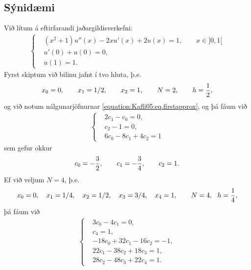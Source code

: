 \documentclass[a4paper,10pt,icelandic]{sphinxmanual}
\begin{document}
\subsection{Sýnidæmi}
\label{\detokenize{Kafli05:synidaemi}}\label{\detokenize{Kafli05:example-5-1-1}}
Við lítum á eftirfarandi jaðargildisverkefni:
\begin{equation*}
\begin{split}\begin{cases}
&\left(x^2+1\right) u''(x)-2 x u'(x)+2 u(x)=1,\qquad  x \in ]0,1[\\
&u'(0)+u(0)=0,\\
&u(1)=1.
\end{cases}\end{split}
\end{equation*}
Fyrst skiptum við bilinu jafnt í tvo hluta,  þ.e.
\begin{equation*}
\begin{split}x_0=0, \qquad x_1= 1/2 , \qquad x_2 = 1, \qquad N=2, \qquad h={1 \over 2},\end{split}
\end{equation*}
og við notum nálgunarjöfnurnar \eqref{equation:Kafli05:eq.firstapprox}, og þá fáum við
\begin{equation*}
\begin{split}\begin{cases}
& 2 c_1-c_0=0, \\
& c_2-1=0,\\
& 6 c_0-8 c_1+4 c_2=1
\end{cases}\end{split}
\end{equation*}
sem gefur okkur
\begin{equation*}
\begin{split}c_0= -{3\over 2}, \qquad c_1 = -{3\over 4}, \qquad c_2 =1.\end{split}
\end{equation*}
Ef við veljum \(N=4\), þ.e.
\begin{equation*}
\begin{split}x_0=0, \quad x_1= 1/4 , \quad x_2 = 1/2, \quad x_3 = 3/4,  \quad x_4 = 1, \qquad N=4, ~~h={1 \over 4},\end{split}
\end{equation*}
þá fáum við
\begin{equation*}
\begin{split}\begin{cases}
& 3 c_0 -4 c_1=0, \\
& c_4 =1,\\
& -18 c_0+32 c_1-16 c_2=-1, \\
& 22 c_1 -38 c_2+18 c_3=1, \\
& 28 c_2-48 c_3+22 c_4 =1.
\end{cases}\end{split}
\end{equation*}
\end{document}
